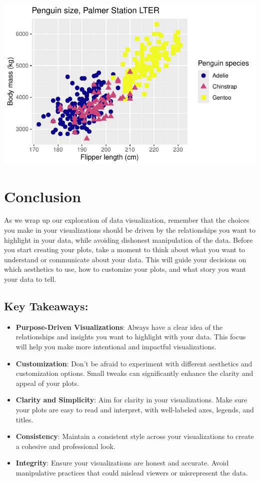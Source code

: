 \documentclass[
  letterpaper,
  DIV=11,
  numbers=noendperiod]{scrreprt}
\providecommand{\tightlist}{%
  \setlength{\itemsep}{0pt}\setlength{\parskip}{0pt}}\usepackage{longtable,booktabs,array}
\begin{document}
\includegraphics{scripts/02_dataViz/class4_files/figure-pdf/viridis-2.pdf}


\chapter{Conclusion}\label{conclusion}

As we wrap up our exploration of data visualization, remember that the
choices you make in your visualizations should be driven by the
relationships you want to highlight in your data, while avoiding
dishonest manipulation of the data. Before you start creating your
plots, take a moment to think about what you want to understand or
communicate about your data. This will guide your decisions on which
aesthetics to use, how to customize your plots, and what story you want
your data to tell.

\section{Key Takeaways:}\label{key-takeaways}

\begin{itemize}
\tightlist
\item
  \textbf{Purpose-Driven Visualizations}: Always have a clear idea of
  the relationships and insights you want to highlight with your data.
  This focus will help you make more intentional and impactful
  visualizations.
\item
  \textbf{Customization}: Don't be afraid to experiment with different
  aesthetics and customization options. Small tweaks can significantly
  enhance the clarity and appeal of your plots.
\item
  \textbf{Clarity and Simplicity}: Aim for clarity in your
  visualizations. Make sure your plots are easy to read and interpret,
  with well-labeled axes, legends, and titles.
\item
  \textbf{Consistency}: Maintain a consistent style across your
  visualizations to create a cohesive and professional look.
\item
  \textbf{Integrity}: Ensure your visualizations are honest and
  accurate. Avoid manipulative practices that could mislead viewers or
  misrepresent the data.
\end{itemize}
\end{document}
